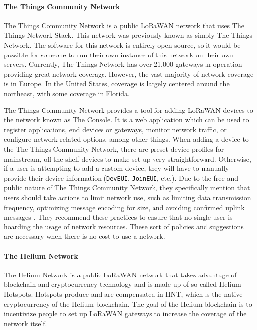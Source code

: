 \paragraph{The Things Community Network}
The Things Community Network is a public LoRaWAN network that uses The Things Network Stack. This network was previously known as simply The Things Network. The software for this network is entirely open source, so it would be possible for someone to run their own instance of this network on their own servers. Currently, The Things Network has over 21,000 gateways in operation providing great network coverage. However, the vast majority of network coverage is in Europe. In the United States, coverage is largely centered around the northeast, with some coverage in Florida.

The Things Community Network provides a tool for adding LoRaWAN devices to the network known as The Console. It is a web application which can be used to register applications, end devices or gateways, monitor network traffic, or configure network related options, among other things. When adding a device to the The Things Community Network, there are preset device profiles for mainstream, off-the-shelf devices to make set up very straightforward. Otherwise, if a user is attempting to add a custom device, they will have to manually provide their device information (\texttt{DevEUI}, \texttt{JoinEUI}, etc.). Due to the free and public nature of The Things Community Network, they specifically mention that users should take actions to limit network use, such as limiting data transmission frequency, optimizing message encoding for size, and avoiding confirmed uplink messages \cite{the-things-network}. They recommend these practices to ensure that no single user is hoarding the usage of network resources. These sort of policies and suggestions are necessary when there is no cost to use a network.

\paragraph{The Helium Network}
The Helium Network is a public LoRaWAN network that takes advantage of blockchain and cryptocurrency technology and is made up of so-called Helium Hotspots. Hotspots produce and are compensated in HNT, which is the native cryptocurrency of the Helium blockchain. The goal of the Helium blockchain is to incentivize people to set up LoRaWAN gateways to increase the coverage of the network itself.

